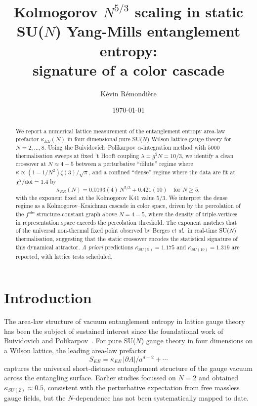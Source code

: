 \documentclass[aps,prl,reprint,nofootinbib,floatfix]{revtex4-2}
\begin{document}
\title{Kolmogorov $N^{5/3}$ scaling in static SU($N$) Yang-Mills entanglement entropy:\\
signature of a color cascade}

\author{K\'evin R\'emondi\`ere}

\date{\today}

\begin{abstract}
We report a numerical lattice measurement of the entanglement entropy area-law prefactor $\kappa_{EE}(N)$ in four-dimensional pure SU($N$) Wilson lattice gauge theory for $N=2,\ldots,8$. Using the Buividovich--Polikarpov $\alpha$-integration method with $5000$ thermalisation sweeps at fixed 't Hooft coupling $\lambda=g^2N=10/3$, we identify a clean crossover at $N\approx 4{-}5$ between a perturbative ``dilute'' regime where $\kappa\propto(1-1/N^2)\zeta(3)/\sqrt{\pi}$, and a confined ``dense'' regime where the data are fit at $\chi^2/\mathrm{dof}=1.4$ by
\[
\kappa_{EE}(N) = 0.0193(4)\, N^{5/3} + 0.421(10) \quad \text{for } N\ge 5,
\]
with the exponent fixed at the Kolmogorov K41 value $5/3$. We interpret the dense regime as a Kolmogorov--Kraichnan cascade in color space, driven by the percolation of the $f^{abc}$ structure-constant graph above $N=4{-}5$, where the density of triple-vertices in representation space exceeds the percolation threshold. The exponent matches that of the universal non-thermal fixed point observed by Berges \emph{et al.}\ in real-time SU($N$) thermalisation, suggesting that the static crossover encodes the statistical signature of this dynamical attractor. \emph{A priori} predictions $\kappa_{SU(9)}=1.175$ and $\kappa_{SU(10)}=1.319$ are reported, with lattice tests scheduled.
\end{abstract}

\maketitle

\section{Introduction}

The area-law structure of vacuum entanglement entropy in lattice gauge theory has been the subject of sustained interest since the foundational work of Buividovich and Polikarpov~\cite{BP2008}. For pure SU($N$) gauge theory in four dimensions on a Wilson lattice, the leading area-law prefactor
\[
S_{EE} = \kappa_{EE}\,|\partial A|/a^{d-2} + \cdots
\]
captures the universal short-distance entanglement structure of the gauge vacuum across the entangling surface. Earlier studies focussed on $N=2$ and obtained $\kappa_{SU(2)} \approx 0.5$, consistent with the perturbative expectation from free massless gauge fields, but the $N$-dependence has not been systematically mapped to date.
\end{document}
